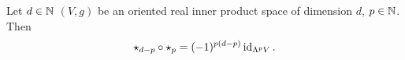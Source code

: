 \begin{proposition}
  Let
    $d \in \mathbb{N}$
    $(V, g)$ be an oriented real inner product space of dimension $d$,
    $p \in \mathbb{N}$.
  Then
  \begin{equation}
    \star_{d - p} \circ \star_p = (-1)^{p (d - p)} \mathop{\rm id}\nolimits_{\Lambda^p V}.
  \end{equation}
\end{proposition}

